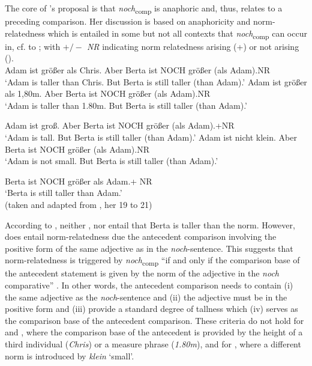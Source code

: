 \documentclass[output=paper
,modfonts
,nonflat]{langsci/langscibook}
\begin{document}
The core of \citeauthor{umbach2009a_comp}'s \citeyearpar{umbach2009a_comp} proposal is that \textit{noch}\textsubscript{comp} is anaphoric and, thus, relates to a preceding comparison. Her discussion is based on anaphoricity and norm-relatedness which is entailed in some but not all contexts that \textit{noch}\textsubscript{comp} can occur in, cf.  to ; with \textit{$+/-$ NR} indicating norm relatedness arising (+) or not arising (\textminus).\\


\ea \label{umbach_19} \ea \small Adam ist größer als Chris. Aber Berta ist NOCH größer (als Adam).\hfill \textminus NR\\ {`Adam is taller than Chris. But Berta is still taller (than Adam).'} \label{umbach_19a}
\ex \small Adam ist größer als 1,80m. Aber Berta ist NOCH größer (als Adam).\hfill \textminus NR\\ {`Adam is taller than 1.80m. But Berta is still taller (than Adam).'} \label{umbach_19b}\\
   \z\z

\ea\label{umbach_20} \ea\small Adam ist groß. Aber Berta ist NOCH größer (als Adam).\hfill +NR\\ {`Adam is tall. But Berta is still taller (than Adam).'} \label{umbach_20a}
\ex\small Adam ist nicht klein. Aber Berta ist NOCH größer (als Adam).\hfill \textminus NR\\ {`Adam is not small. But Berta is still taller (than Adam).'} \label{umbach_20b}\\
\z\z

\ea\small\label{umbach_21} Berta ist NOCH größer als Adam.\hfill + NR\\ {`Berta is still taller than Adam.'} \\ (taken and adapted from \citet{umbach2009a_comp}, her 19 to 21)\z


\noindent According to \citet{umbach2009a_comp}, neither ,  nor  entail that Berta is taller than the norm. However,  does entail norm-relatedness due the antecedent comparison involving the positive form of the same adjective as in the \textit{noch}-sentence. This suggests that norm-relatedness is triggered by \textit{noch}\textsubscript{comp} ``if and only if the comparison base of the antecedent statement is given by the norm of the adjective in the \textit{noch} comparative'' \citet[10]{umbach2009a_comp}. In other words, the antecedent comparison needs to contain (i) the same adjective as the \textit{noch}-sentence and (ii) the adjective must be in the positive form and (iii) provide a standard degree of tallness which (iv) serves as the comparison base of the antecedent comparison. These criteria do not hold for  and , where the comparison base of the antecedent is provided by the height of a third individual (\textit{Chris}) or a measure phrase (\textit{1.80m}), and for , where a different norm is introduced by \textit{klein} `small'.
\end{document}
